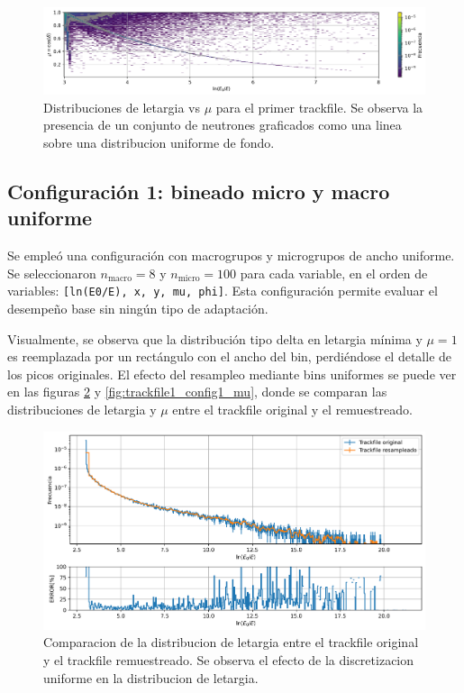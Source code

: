 \begin{figure}[h]
    \centering
    \includegraphics[width=\textwidth]{figs/fig2_3.png}
    \caption{Distribuciones de letargia vs $\mu$ para el primer trackfile. Se observa la presencia de un conjunto de neutrones graficados como una linea sobre una distribucion uniforme de fondo.}
    \label{fig:trackfile1_letargia_mu_2}
\end{figure}

\subsection{Configuración 1: bineado micro y macro uniforme}  
Se empleó una configuración con macrogrupos y microgrupos de ancho uniforme. Se seleccionaron $n_{\text{macro}} = 8$ y $n_{\text{micro}} = 100$ para cada variable, en el orden de variables: \texttt{[ln(E0/E), x, y, mu, phi]}. Esta configuración permite evaluar el desempeño base sin ningún tipo de adaptación.

Visualmente, se observa que la distribución tipo delta en letargia mínima y $\mu = 1$ es reemplazada por un rectángulo con el ancho del bin, perdiéndose el detalle de los picos originales. El efecto del resampleo mediante bins uniformes se puede ver en las figuras \ref{fig:trackfile1_config1_letargia} y \ref{fig:trackfile1_config1_mu}, donde se comparan las distribuciones de letargia y $\mu$ entre el trackfile original y el remuestreado.

\begin{figure}[h]
    \centering
    \includegraphics[width=\textwidth]{figs/fig2_4.png}
    \caption{Comparacion de la distribucion de letargia entre el trackfile original y el trackfile remuestreado. Se observa el efecto de la discretizacion uniforme en la distribucion de letargia.}
    \label{fig:trackfile1_config1_letargia}
\end{figure}

